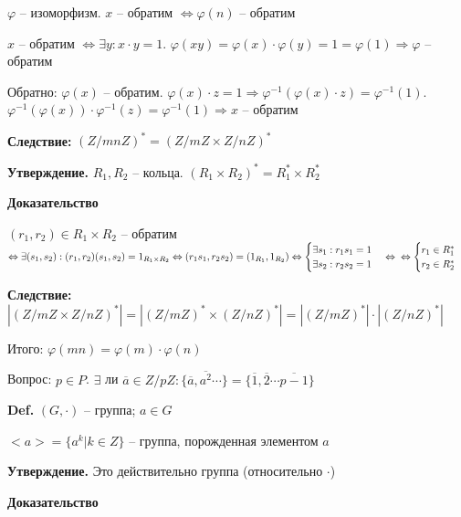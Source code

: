 \documentclass[14pt, letter paper]{article}
\begin{document}
$\varphi$ -- изоморфизм. $x$ -- обратим $\Leftrightarrow \varphi(n)$ -- обратим

$x$ -- обратим $\Leftrightarrow \exists y : x \cdot y = 1$. $\varphi(xy) = \varphi(x) \cdot \varphi(y) = 1 = \varphi(1) \Rightarrow \varphi$ -- обратим

Обратно: $\varphi(x)$ -- обратим. $\varphi(x) \cdot z = 1 \Rightarrow \varphi^{-1}(\varphi(x) \cdot z) = \varphi^{-1}(1)$. $\varphi^{-1}(\varphi(x)) \cdot \varphi^{-1}(z) = \varphi^{-1}(1) \Rightarrow x$ -- обратим

\textbf{Следствие:} $(Z/mnZ)^* = (Z/mZ \times Z/nZ)^*$

\textbf{Утверждение.} $R_1, R_2$ -- кольца. $(R_1 \times R_2)^* = R_1^* \times R_2^*$

\begin{center}
    \textbf{Доказательство}
\end{center}

$(r_1, r_2) \in R_1 \times R_2$ -- обратим $\Leftrightarrow \exists (s_1, s_2) : (r_1, r_2)(s_1, s_2) = 1_{R_1 \times R_2} \Leftrightarrow (r_1s_1, r_2s_2) = (1_{R_1}, 1_{R_2}) \Leftrightarrow \begin{cases}
    \exists s_1 : r_1s_1 = 1 \\
    \exists s_2 : r_2s_2 = 1
\end{cases} \Leftrightarrow \\ \Leftrightarrow \begin{cases}
    r_1 \in R_1^* \\
    r_2 \in R_2^*
\end{cases}$

\textbf{Следствие:} $|(Z/mZ \times Z/nZ)^*| = |(Z/mZ)^* \times (Z/nZ)^*| = |(Z/mZ)^*| \cdot |(Z/nZ)^*|$

Итого: $\varphi(mn) = \varphi(m) \cdot \varphi(n)$

\vspace{5mm}

Вопрос: $p \in P$. $\exists$ ли $\overline{a} \in Z/pZ : \{\overline{a}, \overline{a^2} \cdots\} = \{\overline{1}, \overline{2} \cdots \overline{p-1}\}$

\textbf{Def.} $(G, \cdot)$ -- группа; $a \in G$

$<a> = \{ a^k| k \in Z\}$ -- группа, порожденная элементом $a$

\textbf{Утверждение.} Это действительно группа (относительно $\cdot$)

\begin{center}
    \textbf{Доказательство}
\end{center}
\end{document}
